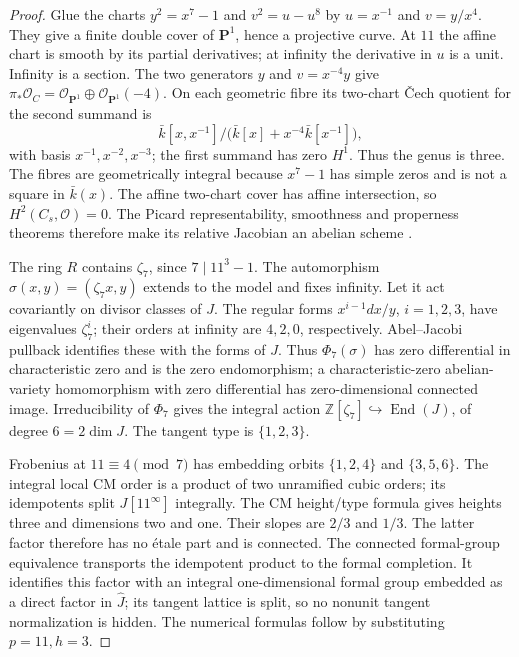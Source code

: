 \documentclass[11pt,a4paper]{article}
\theoremstyle{definition}\newtheorem{remark}[theorem]{Remark}
\newcommand{\Z}{\mathbb Z}\newcommand{\Q}{\mathbb Q}\newcommand{\F}{\mathbb F}
\begin{document}
\begin{proof}
Glue the charts $y^2=x^7-1$ and $v^2=u-u^8$ by $u=x^{-1}$ and $v=y/x^4$. They give a finite double cover of $\mathbf P^1$, hence a projective curve. At $11$ the affine chart is smooth by its partial derivatives; at infinity the derivative in $u$ is a unit. Infinity is a section. The two generators $y$ and $v=x^{-4}y$ give $\pi_*\mathcal O_C=\mathcal O_{\mathbf P^1}\oplus\mathcal O_{\mathbf P^1}(-4)$. On each geometric fibre its two-chart \v Cech quotient for the second summand is
\[
 \bar k[x,x^{-1}]/\bigl(\bar k[x]+x^{-4}\bar k[x^{-1}]\bigr),
\]
with basis $x^{-1},x^{-2},x^{-3}$; the first summand has zero $H^1$. Thus the genus is three. The fibres are geometrically integral because $x^7-1$ has simple zeros and is not a square in $\bar k(x)$. The affine two-chart cover has affine intersection, so $H^2(C_s,\mathcal O)=0$. The Picard representability, smoothness and properness theorems therefore make its relative Jacobian an abelian scheme \cite[expos\'e 232, Theorem 3.1; expos\'e 236, Corollaries 1.7 and 2.3, Proposition 2.10(ii)]{FGAPic}.

The ring $R$ contains $\zeta_7$, since $7\mid11^3-1$. The automorphism $\sigma(x,y)=(\zeta_7x,y)$ extends to the model and fixes infinity. Let it act covariantly on divisor classes of $J$. The regular forms $x^{i-1}dx/y$, $i=1,2,3$, have eigenvalues $\zeta_7^i$; their orders at infinity are $4,2,0$, respectively. Abel--Jacobi pullback identifies these with the forms of $J$. Thus $\Phi_7(\sigma)$ has zero differential in characteristic zero and is the zero endomorphism; a characteristic-zero abelian-variety homomorphism with zero differential has zero-dimensional connected image. Irreducibility of $\Phi_7$ gives the integral action $\Z[\zeta_7]\hookrightarrow\operatorname{End}(J)$, of degree $6=2\dim J$. The tangent type is $\{1,2,3\}$.

Frobenius at $11\equiv4\pmod7$ has embedding orbits $\{1,2,4\}$ and $\{3,5,6\}$. The integral local CM order is a product of two unramified cubic orders; its idempotents split $J[11^\infty]$ integrally. The CM height/type formula \cite[\S5, (10*) and Theorem 3, pp.~106--108]{Tate352} gives heights three and dimensions two and one. Their slopes are $2/3$ and $1/3$. The latter factor therefore has no \'etale part and is connected. The connected formal-group equivalence \cite[\S2.2, Proposition 1, p.~162; \S2.3, Example (b), p.~166]{Tate67} transports the idempotent product to the formal completion. It identifies this factor with an integral one-dimensional formal group embedded as a direct factor in $\widehat J$; its tangent lattice is split, so no nonunit tangent normalization is hidden. The numerical formulas follow by substituting $p=11,h=3$.
\end{proof}
\end{document}
